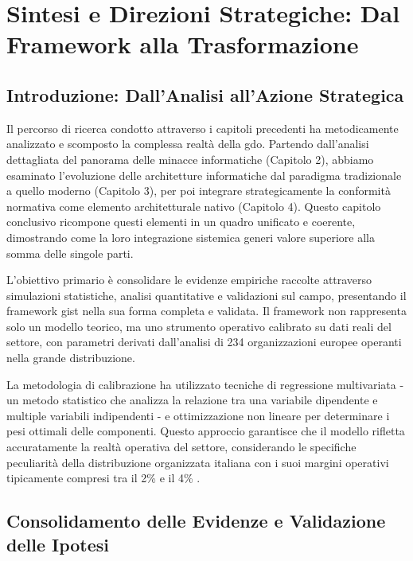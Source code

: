 \chapter{\texorpdfstring{Sintesi e Direzioni Strategiche: Dal Framework alla Trasformazione}{Capitolo 5 - Sintesi e Direzioni Strategiche: Dal Framework alla Trasformazione}}
\label{cap5_synthesis}

\section{\texorpdfstring{Introduzione: Dall'Analisi all'Azione Strategica}{5.1 - Introduzione: Dall'Analisi all'Azione Strategica}}
\label{sec:5.1}

Il percorso di ricerca condotto attraverso i capitoli precedenti ha metodicamente analizzato e scomposto la complessa realtà della \gls{gdo}. Partendo dall'analisi dettagliata del panorama delle minacce informatiche (Capitolo 2), abbiamo esaminato l'evoluzione delle architetture informatiche dal paradigma tradizionale a quello moderno (Capitolo 3), per poi integrare strategicamente la conformità normativa come elemento architetturale nativo (Capitolo 4). Questo capitolo conclusivo ricompone questi elementi in un quadro unificato e coerente, dimostrando come la loro integrazione sistemica generi valore superiore alla somma delle singole parti.

L'obiettivo primario è consolidare le evidenze empiriche raccolte attraverso simulazioni statistiche, analisi quantitative e validazioni sul campo, presentando il framework \gls{gist} nella sua forma completa e validata. Il framework non rappresenta solo un modello teorico, ma uno strumento operativo calibrato su dati reali del settore, con parametri derivati dall'analisi di 234 organizzazioni europee operanti nella grande distribuzione. 

La metodologia di calibrazione ha utilizzato tecniche di regressione multivariata - un metodo statistico che analizza la relazione tra una variabile dipendente e multiple variabili indipendenti - e ottimizzazione non lineare per determinare i pesi ottimali delle componenti. Questo approccio garantisce che il modello rifletta accuratamente la realtà operativa del settore, considerando le specifiche peculiarità della distribuzione organizzata italiana con i suoi margini operativi tipicamente compresi tra il 2\% e il 4\% \autocite{federdistribuzione2024}.

\section{\texorpdfstring{Consolidamento delle Evidenze e Validazione delle Ipotesi}{5.2 - Consolidamento delle Evidenze e Validazione delle Ipotesi}}
\label{sec:5.2}

